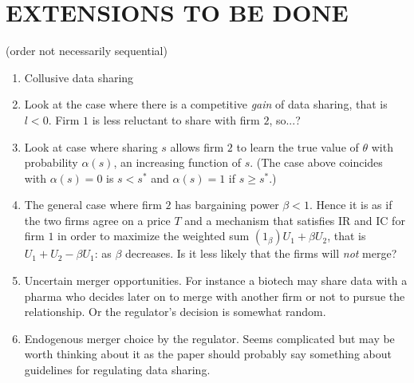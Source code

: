 \documentclass[a4paper]{article}
\renewcommand{\t}{\theta}
\begin{document}
\section{EXTENSIONS TO BE DONE}  
(order not necessarily sequential)
    \begin{enumerate}[TBD 1.]\setlength\itemsep{0em}
    \item Collusive data sharing
      \item Look at the case where there is a competitive \emph{gain} of data sharing, that is $l<0$. Firm $1$ is less reluctant to share with firm $2$, so...?
      \item Look at case where sharing $s$ allows firm $2$ to learn the true value of $\t$ with probability $\alpha(s)$, an increasing function of $s$. (The case above coincides with $\alpha(s)=0$ is $s<s^*$ and $\alpha(s)=1$ if $s\geq s^*$.)
      \item The general case where firm $2$ has bargaining power $\beta<1$. Hence it is as if the two firms agree on a price $T$ and a mechanism that satisfies IR and IC for firm $1$ in order to maximize the weighted sum $(1_\beta)U_1+\beta U_2$, that is $U_1+U_2-\beta U_1$: as $\beta$ decreases. Is it less likely that the firms will \emph{not} merge?
      \item Uncertain merger opportunities. For instance a biotech may share data with a pharma who decides later on to merge with another firm or not to pursue the relationship. Or the regulator's decision is somewhat random.
      \item Endogenous merger choice by the regulator. Seems complicated but may be worth thinking about it as the paper should probably say something about guidelines for regulating data sharing.
    \end{enumerate}



\end{document}
